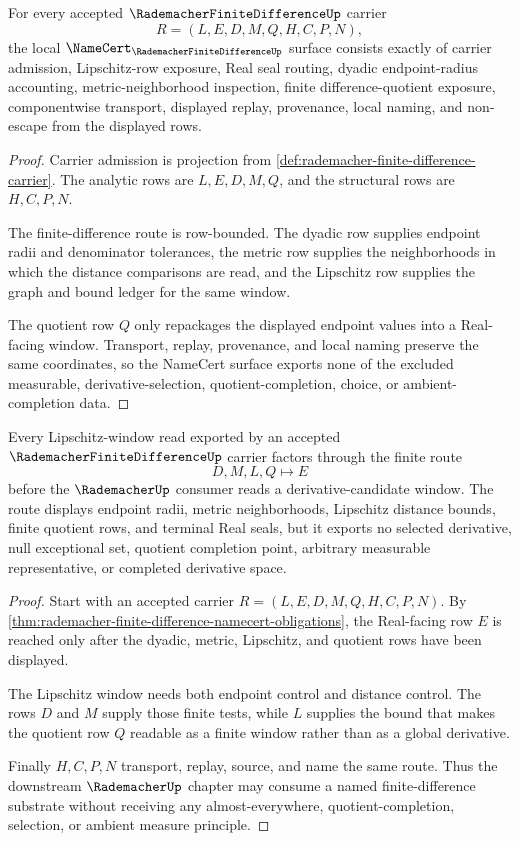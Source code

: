 \begin{theorem}
\label{thm:rademacher-finite-difference-namecert-obligations}
For every accepted $\RademacherFiniteDifferenceUp$ carrier
$$
R=(L,E,D,M,Q,H,C,P,N),
$$
the local $\NameCert_{\RademacherFiniteDifferenceUp}$ surface consists exactly of carrier admission, Lipschitz-row exposure, Real seal routing, dyadic endpoint-radius accounting, metric-neighborhood inspection, finite difference-quotient exposure, componentwise transport, displayed replay, provenance, local naming, and non-escape from the displayed rows.
\end{theorem}
\begin{proof}
Carrier admission is projection from \autoref{def:rademacher-finite-difference-carrier}. The analytic rows are $L,E,D,M,Q$, and the structural rows are $H,C,P,N$.

The finite-difference route is row-bounded. The dyadic row supplies endpoint radii and denominator tolerances, the metric row supplies the neighborhoods in which the distance comparisons are read, and the Lipschitz row supplies the graph and bound ledger for the same window.

The quotient row $Q$ only repackages the displayed endpoint values into a Real-facing window. Transport, replay, provenance, and local naming preserve the same coordinates, so the NameCert surface exports none of the excluded measurable, derivative-selection, quotient-completion, choice, or ambient-completion data.
\end{proof}

\begin{theorem}
\label{thm:rademacher-finite-difference-lipschitz-window-route}
Every Lipschitz-window read exported by an accepted $\RademacherFiniteDifferenceUp$ carrier factors through the finite route
$$
D,M,L,Q \longmapsto E
$$
before the $\RademacherUp$ consumer reads a derivative-candidate window. The route displays endpoint radii, metric neighborhoods, Lipschitz distance bounds, finite quotient rows, and terminal Real seals, but it exports no selected derivative, null exceptional set, quotient completion point, arbitrary measurable representative, or completed derivative space.
\end{theorem}
\begin{proof}
Start with an accepted carrier $R=(L,E,D,M,Q,H,C,P,N)$. By \autoref{thm:rademacher-finite-difference-namecert-obligations}, the Real-facing row $E$ is reached only after the dyadic, metric, Lipschitz, and quotient rows have been displayed.

The Lipschitz window needs both endpoint control and distance control. The rows $D$ and $M$ supply those finite tests, while $L$ supplies the bound that makes the quotient row $Q$ readable as a finite window rather than as a global derivative.

Finally $H,C,P,N$ transport, replay, source, and name the same route. Thus the downstream $\RademacherUp$ chapter may consume a named finite-difference substrate without receiving any almost-everywhere, quotient-completion, selection, or ambient measure principle.
\end{proof}

